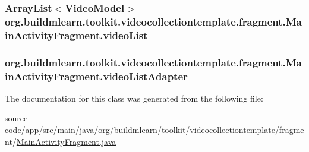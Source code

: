 \subsubsection[{\texorpdfstring{video\+List}{videoList}}]{\setlength{\rightskip}{0pt plus 5cm}Array\+List$<${\bf Video\+Model}$>$ org.\+buildmlearn.\+toolkit.\+videocollectiontemplate.\+fragment.\+Main\+Activity\+Fragment.\+video\+List\hspace{0.3cm}{\ttfamily [private]}}\hypertarget{classorg_1_1buildmlearn_1_1toolkit_1_1videocollectiontemplate_1_1fragment_1_1MainActivityFragment_a2e22394adf697de7987441b919a89671}{}\label{classorg_1_1buildmlearn_1_1toolkit_1_1videocollectiontemplate_1_1fragment_1_1MainActivityFragment_a2e22394adf697de7987441b919a89671}
\subsubsection[{\texorpdfstring{video\+List\+Adapter}{videoListAdapter}}]{ org.\+buildmlearn.\+toolkit.\+videocollectiontemplate.\+fragment.\+Main\+Activity\+Fragment.\+video\+List\+Adapter\hspace{0.3cm}{\ttfamily [private]}}\hypertarget{classorg_1_1buildmlearn_1_1toolkit_1_1videocollectiontemplate_1_1fragment_1_1MainActivityFragment_a37e843e77a3b805f2f696c3353fe3296}{}\label{classorg_1_1buildmlearn_1_1toolkit_1_1videocollectiontemplate_1_1fragment_1_1MainActivityFragment_a37e843e77a3b805f2f696c3353fe3296}


The documentation for this class was generated from the following file\+:\begin{DoxyCompactItemize}
\item 
source-\/code/app/src/main/java/org/buildmlearn/toolkit/videocollectiontemplate/fragment/\hyperlink{videocollectiontemplate_2fragment_2MainActivityFragment_8java}{Main\+Activity\+Fragment.\+java}\end{DoxyCompactItemize}
